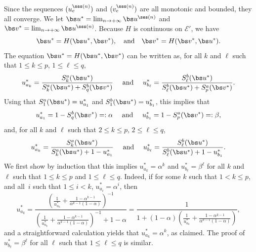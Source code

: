 Since the sequences $(u_e^{\sss (n)})$ and $(v_e^{\sss (n)})$ are all {monotonic} and bounded,
they all converge.
We let $\bs u^* = \lim_{n\to+\infty} \bs u^{\sss (n)}$ and $\bs v^*= \lim_{n\to+\infty} \bs u^{\sss (n)}$.
Because $H$ is continuous on $\mathcal E'$,
we have
\[
\bs u^*= H(\bs u^*,\bs v^*),\quad \text{and}\quad \bs v^*=H(\bs v^*,\bs u^*).
\]
The equation $\bs u^*=H(\bs u^*,\bs v^*)$ can be written as, for all $k$ and $\ell$ such that $1\leq k\leq p$, $1\leq\ell\leq q$,
\[
u^*_{a_k} = \frac{S^a_k(\bs u^*)}{S^a_k(\bs u^*)+S^b_q(\bs v^*)}
\quad\text{ and }\quad
u^*_{b_\ell} = \frac{S^b_\ell(\bs u^*)}{S^b_\ell(\bs u^*)+S^a_p(\bs v^*)}.
\]
Using that $S^a_1(\bs u^*)=u^*_{a_1}$ and $S^b_1(\bs u^*)=u^*_{b_1}$, this implies that
\begin{equation}\label{eq:alpha_beta}
u^*_{a_1} = 1-S^{b}_q(\bs v^*)=:\alpha
\quad\text{ and }\quad
u^*_{b_1} = 1-S^{a}_p(\bs v^*)=:\beta,
\end{equation}
and, for all $k$ and $\ell$ such that $2\leq k\leq p$, $2\leq \ell\leq q$,
\[
u^*_{a_k} = \frac{S^a_k(\bs u^*)}{S^a_k(\bs u^*)+1-u^*_{a_1}}
\quad\text{ and }\quad
u^*_{b_\ell} = \frac{S^b_\ell(\bs u^*)}{S^b_\ell(\bs u^*)+1-u^*_{b_1}}.
\]
We first show by induction that this implies $u^*_{a_k} = \alpha^k$
and $u^*_{b_\ell} = \beta^\ell$ for all $k$ and $\ell$ such that $1\leq k\leq p$ and $1\leq \ell\leq q$.
Indeed, if for some $k$ such that $1< k\le p$, and all~$i$ such that $1\leq i< k$, $u^*_{a_i} = \alpha^i$, then
\[
u^*_{a_k} = \frac{\left( \frac{1}{u^*_{a_k}}+\frac{1-\alpha^{k-1}}{\alpha^{k-1}(1-\alpha)}\right)^{-1}}{\left( \frac{1}{u^*_{a_k}}+\frac{1-\alpha^{k-1}}{\alpha^{k-1}(1-\alpha)}\right)^{-1}+1-\alpha}
= \frac{1}{1+(1-\alpha)\left( \frac{1}{u^*_{a_k}}+\frac{1-\alpha^{k-1}}{\alpha^{k-1}(1-\alpha)}\right)},
\]
and a straightforward calculation yields that $u^*_{a_k}=\alpha^k$,
as claimed.
The proof of $u^*_{b_\ell} = \beta^\ell$ for all $\ell$ such that $1\leq\ell\leq q$ is similar.

